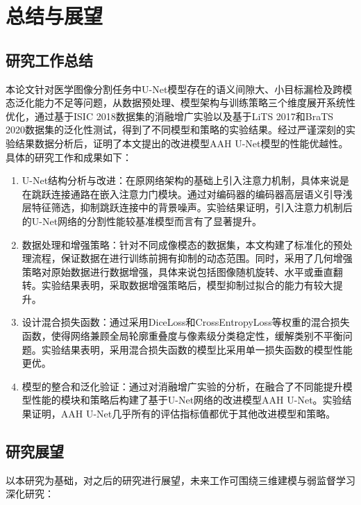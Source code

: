 \section{总结与展望}

\subsection{研究工作总结}
本论文针对医学图像分割任务中U-Net模型存在的语义间隙大、小目标漏检及跨模态泛化能力不足等问题，从数据预处理、模型架构与训练策略三个维度展开系统性优化，通过基于ISIC 2018数据集的消融增广实验以及基于LiTS 2017和BraTS 2020数据集的泛化性测试，得到了不同模型和策略的实验结果。经过严谨深刻的实验结果数据分析后，证明了本文提出的改进模型AAH U-Net模型的性能优越性。具体的研究工作和成果如下：

\begin{enumerate}
    \item U-Net结构分析与改进：在原网络架构的基础上引入注意力机制，具体来说是在跳跃连接通路在嵌入注意力门模块。通过对编码器的编码器高层语义引导浅层特征筛选，抑制跳跃连接中的背景噪声。实验结果证明，引入注意力机制后的U-Net网络的分割性能较基准模型而言有了显著提升。
    \item 数据处理和增强策略：针对不同成像模态的数据集，本文构建了标准化的预处理流程，保证数据在进行训练前拥有抑制的动态范围。同时，采用了几何增强策略对原始数据进行数据增强，具体来说包括图像随机旋转、水平或垂直翻转。实验结果表明，采取数据增强策略后，模型抑制过拟合的能力有较大提升。
    \item 设计混合损失函数：通过采用DiceLoss和CrossEntropyLoss等权重的混合损失函数，使得网络兼顾全局轮廓重叠度与像素级分类稳定性，缓解类别不平衡问题。实验结果表明，采用混合损失函数的模型比采用单一损失函数的模型性能更优。
    \item 模型的整合和泛化验证：通过对消融增广实验的分析，在融合了不同能提升模型性能的模块和策略后构建了基于U-Net网络的改进模型AAH U-Net。实验结果证明，AAH U-Net几乎所有的评估指标值都优于其他改进模型和策略。
\end{enumerate}

\subsection{研究展望}

以本研究为基础，对之后的研究进行展望，未来工作可围绕三维建模与弱监督学习深化研究：

